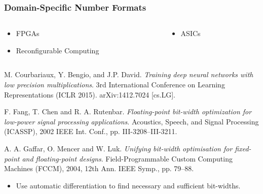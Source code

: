 \begin{frame}

\frametitle{Domain-Specific Number Formats}

\begin{columns}[t]

\begin{column}{0.5\textwidth}

\begin{itemize}

\item FPGAs

\item Reconfigurable Computing

\end{itemize}

\end{column}

\begin{column}{0.5\textwidth}

\begin{itemize}

\item ASICs

\end{itemize}

\end{column}

\end{columns}

\vspace{\fill}

\footnotesize

\begin{thebibliography}{9}

 M. Courbariaux, Y. Bengio, and J.P. David.
\emph{Training deep neural networks with low precision multiplications}. 3rd
International Conference on Learning Representations (ICLR 2015).
arXiv:1412.7024 [cs.LG].

 F. Fang, T. Chen and R. A.  Rutenbar.
\emph{Floating-point bit-width optimization for low-power signal processing
applications}. Acoustics, Speech, and Signal Processing (ICASSP), 2002 IEEE
Int. Conf., pp. III-3208--III-3211.

 A. A. Gaffar, O. Mencer and W. Luk. \emph{Unifying
bit-width optimisation for fixed-point and floating-point designs}.
Field-Programmable Custom Computing Machines (FCCM), 2004, 12th Ann. IEEE
Symp., pp.  79--88.

\begin{itemize}

\scriptsize

\item Use automatic differentiation to find necessary and sufficient bit-widths.

\end{itemize}

\end{thebibliography}

\end{frame}
